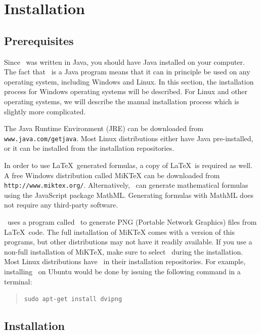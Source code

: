 \chapter{Installation}

\section{Prerequisites}
Since \oxdoc~was written in Java, you should have Java installed on your computer.  
The fact that \oxdoc~is a Java program means that it can in principle be used on 
any operating system, including Windows and Linux. In this section, the installation
process for Windows operating systems will be described. 
For Linux and other operating systems, we will describe the manual installation 
process which is slightly more complicated.

The Java Runtime Environment (JRE) can be downloaded from {\tt www.java.com/getjava}.
Most Linux distributions either have Java pre-installed, or it can be installed from
the installation repositories.

In order to use \LaTeX~generated formulas, a copy of \LaTeX~is required as well.
A free Windows distribution called MiKTeX can be downloaded from {\tt http://www.miktex.org/}.
Alternatively, \oxdoc~can generate mathematical formulas using the JavaScript package
MathML. Generating formulas with MathML does not require any third-party software. 

\oxdoc~uses a program called \dvipng~to generate PNG (Portable Network
Graphics) files from \LaTeX~code.  The full installation of MiKTeX comes with a version
of this programs, but other distributions may not have it readily available.  If you
use a non-full installation of MiKTeX, make sure to select \dvipng~during the
installation. Most Linux distributions have \dvipng~in their installation repositories. For
example, installing \dvipng~on Ubuntu would be done by issuing the following command in a terminal:
\begin{quote}
\tt sudo apt-get install dvipng
\end{quote}

\section{Installation}
